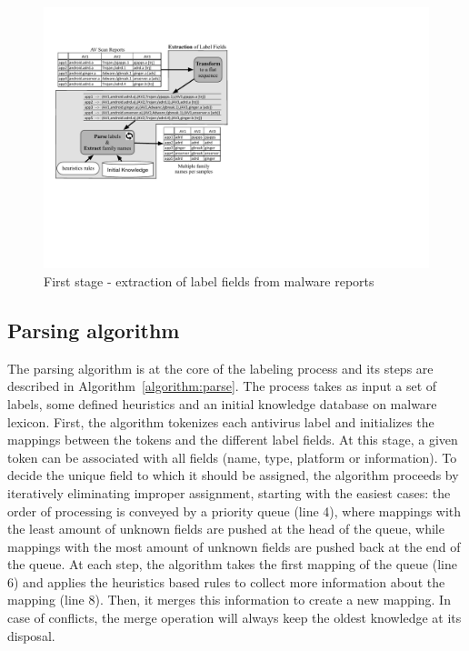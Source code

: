 \begin{figure}
	\centering
	\includegraphics[width=\linewidth]{figures/euphony/extraction01.pdf}
	\caption{First stage - extraction of label fields from malware reports}
	\label{figure:euphony:extraction}
\end{figure}

\subsection{Parsing algorithm}


The parsing algorithm is at the core of the labeling process and its steps are described in Algorithm~\ref{algorithm:parse}.
The process takes as input a set of labels, some defined heuristics and an initial knowledge database on malware lexicon.
First, the algorithm tokenizes each antivirus label and initializes the mappings between the tokens and the different label fields.
At this stage, a given token can be associated with all fields (name, type, platform or information).
To decide the unique field to which it should be assigned, the algorithm proceeds by iteratively eliminating improper assignment, starting with the easiest cases: the order of processing is conveyed by a priority queue (line 4), where mappings with the least amount of unknown fields are pushed at the head of the queue, while mappings with the most amount of unknown fields are pushed back at the end of the queue.
At each step, the algorithm takes the first mapping of the queue (line 6) and applies the heuristics based rules to collect more information about the mapping (line 8).
Then, it merges this information to create a new mapping.
In case of conflicts, the merge operation will always keep the oldest knowledge at its disposal.

